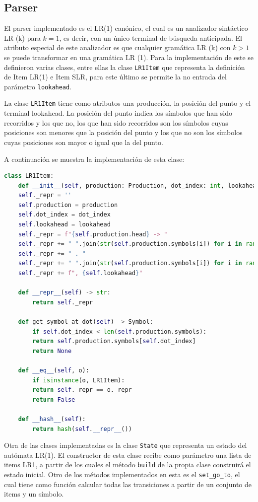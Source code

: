 \documentclass[twoside]{article}
\begin{document}
		\subsection{Parser}
		El parser implementado es el LR(1) can\'onico, el cual es un analizador sintáctico LR (k) para $k=1$, es decir, con un único terminal de búsqueda anticipada. El atributo especial de este analizador es que cualquier gramática LR (k) con $k>1$ se puede transformar en una gramática LR (1).
		Para la implementaci\'on de este se definieron varias clases, entre ellas la clase  \texttt{LR1Item} que representa la definici\'on de Item LR(1) e Item SLR, para este \'ultimo se permite la no entrada del par\'ametro \texttt{lookahead}.
		
		La clase \texttt{LR1Item} tiene como atributos una producci\'on, la posici\'on del punto y el terminal lookahead. La posici\'on del punto indica los s\'imbolos que han sido recorridos y los que no, los que han sido recorridos son los s\'imbolos cuyas posiciones son menores que la posici\'on del punto y los que no son los s\'imbolos cuyas posiciones son mayor o igual que la del punto.
		
		A continuaci\'on se muestra la implementaci\'on de esta clase:\\
		
\begin{lstlisting}[language=Python]
class LR1Item:
	def __init__(self, production: Production, dot_index: int, lookahead: Terminal = None):
	self._repr = ''
	self.production = production
	self.dot_index = dot_index
	self.lookahead = lookahead
	self._repr = f"{self.production.head} -> "
	self._repr += " ".join(str(self.production.symbols[i]) for i in range(self.dot_index))
	self._repr += " . "
	self._repr += " ".join(str(self.production.symbols[i]) for i in range(self.dot_index,len(self.production.symbols)))
	self._repr += f", {self.lookahead}"
	
	def __repr__(self) -> str:
		return self._repr
	
	def get_symbol_at_dot(self) -> Symbol:
		if self.dot_index < len(self.production.symbols):
		return self.production.symbols[self.dot_index]
		return None
	
	def __eq__(self, o):
		if isinstance(o, LR1Item):
		return self._repr == o._repr
		return False
	
	def __hash__(self):
		return hash(self.__repr__())			
\end{lstlisting}
		
		Otra de las clases implementadas es la clase \texttt{State} que representa un estado  del aut\'omata LR(1). El constructor de esta clase recibe como par\'ametro una lista de items LR1, a partir de los cuales el m\'etodo \texttt{build} de la propia clase construir\'a el estado inicial. Otro de los m\'etodos implementados en esta es el \texttt{set\_go\_to}, el cual tiene como funci\'on calcular todas las transiciones a partir de un conjunto de items y un s\'imbolo.
		
\end{document}
